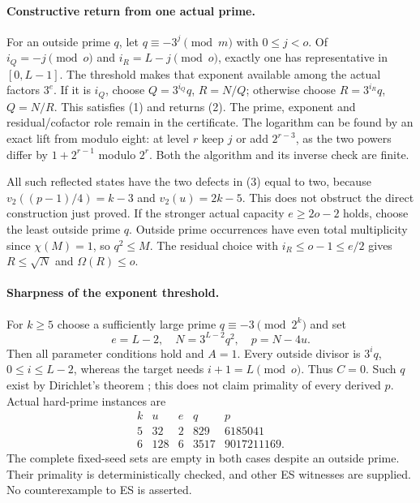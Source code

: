 \documentclass[10pt,a4paper]{article}
\begin{document}
\paragraph{Constructive return from one actual prime.}
For an outside prime $q$, let $q\equiv-3^j\pmod m$ with $0\le j<o$.
Of $i_Q=-j\pmod o$ and $i_R=L-j\pmod o$, exactly one has representative
in $[0,L-1]$. The threshold makes that exponent available among the actual
factors $3^e$. If it is $i_Q$, choose $Q=3^{i_Q}q$, $R=N/Q$; otherwise choose
$R=3^{i_R}q$, $Q=N/R$. This satisfies (1) and returns (2).
The prime, exponent and residual/cofactor role remain in the certificate.
The logarithm can be found by an exact lift from modulo eight: at level $r$
keep $j$ or add $2^{r-3}$, as the two powers differ by $1+2^{r-1}$ modulo
$2^r$. Both the algorithm and its inverse check are finite.

All such reflected states have the two defects in (3) equal to two, because
$v_2((p-1)/4)=k-3$ and $v_2(u)=2k-5$. This does not obstruct the direct
construction just proved. If the stronger actual capacity $e\ge2o-2$ holds,
choose the least outside prime $q$. Outside prime occurrences have even total
multiplicity since $\chi(M)=1$, so $q^2\le M$. The residual choice with
$i_R\le o-1\le e/2$ gives $R\le\sqrt N$ and $\Omega(R)\le o$.

\paragraph{Sharpness of the exponent threshold.}
For $k\ge5$ choose a sufficiently large prime $q\equiv-3\pmod{2^k}$ and set
\[
 e=L-2,\quad N=3^{L-2}q^2,\quad p=N-4u.
\]
Then all parameter conditions hold and $A=1$. Every outside divisor is
$3^iq$, $0\le i\le L-2$, whereas the target needs $i+1=L\pmod o$.
Thus $C=0$. Such $q$ exist by Dirichlet's theorem \cite[Theorem 18.1]{Dir};
this does not claim primality of every derived $p$.
Actual hard-prime instances are
\[
\begin{array}{c|r|r|r|r}
k&u&e&q&p\\\hline
5&32&2&829&6185041\\
6&128&6&3517&9017211169.
\end{array}
\]
The complete fixed-seed sets are empty in both cases despite an outside prime.
Their primality is deterministically checked, and other ES witnesses are
supplied. No counterexample to ES is asserted.

\newpage
\end{document}

